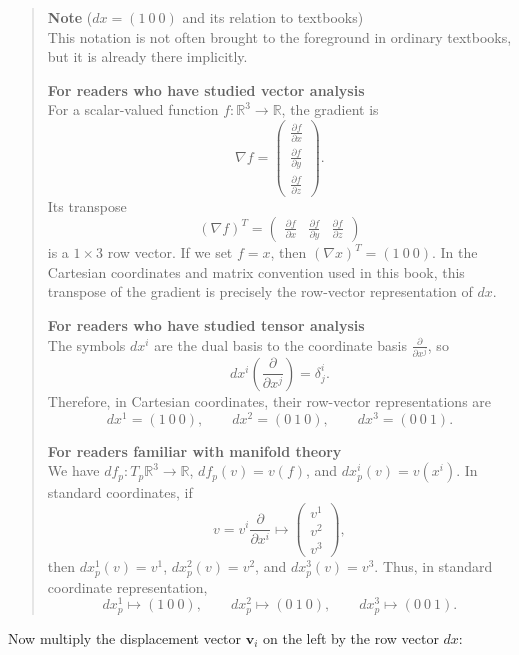 \documentclass[a4paper,12pt,openany]{book}
\begin{document}
\begin{quote}
\textbf{Note} (\(dx=(1\ 0\ 0)\) and its relation to textbooks)\\
This notation is not often brought to the foreground in ordinary
textbooks, but it is already there implicitly.

\textbf{For readers who have studied vector analysis}\\
For a scalar-valued function \(f:\mathbb{R}^3\to\mathbb{R}\), the
gradient is \[
\nabla f = \begin{pmatrix}
\frac{\partial f}{\partial x} \\
\frac{\partial f}{\partial y} \\
\frac{\partial f}{\partial z}
\end{pmatrix}.
\] Its transpose \[
(\nabla f)^T=
\begin{pmatrix}
\frac{\partial f}{\partial x} &
\frac{\partial f}{\partial y} &
\frac{\partial f}{\partial z}
\end{pmatrix}
\] is a \(1\times3\) row vector. If we set \(f=x\), then
\((\nabla x)^T=(1\ 0\ 0)\). In the Cartesian coordinates and matrix
convention used in this book, this transpose of the gradient is
precisely the row-vector representation of \(dx\).

\textbf{For readers who have studied tensor analysis}\\
The symbols \(dx^i\) are the dual basis to the coordinate basis
\(\frac{\partial}{\partial x^j}\), so \[
dx^i\!\left(\frac{\partial}{\partial x^j}\right)=\delta^i_j.
\] Therefore, in Cartesian coordinates, their row-vector representations
are \[
dx^1=(1\ 0\ 0),\qquad dx^2=(0\ 1\ 0),\qquad dx^3=(0\ 0\ 1).
\]

\textbf{For readers familiar with manifold theory}\\
We have \(df_p:T_p\mathbb{R}^3\to\mathbb{R}\), \(df_p(v)=v(f)\), and
\(dx^i_p(v)=v(x^i)\). In standard coordinates, if \[
v=v^i\frac{\partial}{\partial x^i}
\longmapsto
\begin{pmatrix}v^1\\v^2\\v^3\end{pmatrix},
\] then \(dx^1_p(v)=v^1\), \(dx^2_p(v)=v^2\), and \(dx^3_p(v)=v^3\).
Thus, in standard coordinate representation, \[
dx^1_p\longmapsto(1\ 0\ 0),\qquad
dx^2_p\longmapsto(0\ 1\ 0),\qquad
dx^3_p\longmapsto(0\ 0\ 1).
\]
\end{quote}

Now multiply the displacement vector \(\mathbf{v}_i\) on the left by the
row vector \(dx\):
\end{document}
